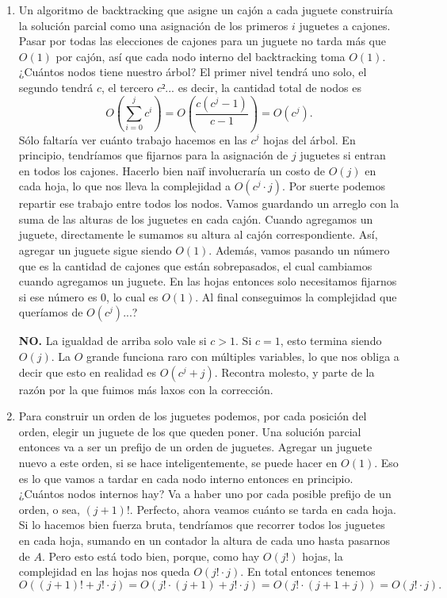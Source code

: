 \documentclass{article}
\begin{document}
\begin{enumerate}
    \item Un algoritmo de backtracking que asigne un cajón a cada juguete construiría la solución parcial como una asignación de los primeros $i$ juguetes a cajones. Pasar por todas las elecciones de cajones para un juguete no tarda más que $O(1)$ por cajón, así que cada nodo interno del backtracking toma $O(1)$. ¿Cuántos nodos tiene nuestro árbol? El primer nivel tendrá uno solo, el segundo tendrá $c$, el tercero $c²$... es decir, la cantidad total de nodos es 
    \[
    O\left(\sum_{i=0}^j c^i\right) = O\left(\frac{c(c^j - 1)}{c-1}\right) = O(c^j).
    \]
    Sólo faltaría ver cuánto trabajo hacemos en las $c^j$ hojas del árbol. En principio, tendríamos que fijarnos para la asignación de $j$ juguetes si entran en todos los cajones. Hacerlo bien naïf involucraría un costo de $O(j)$ en cada hoja, lo que nos lleva la complejidad a $O(c^j\cdot j)$. Por suerte podemos repartir ese trabajo entre todos los nodos. Vamos guardando un arreglo con la suma de las alturas de los juguetes en cada cajón. Cuando agregamos un juguete, directamente le sumamos su altura al cajón correspondiente. Así, agregar un juguete sigue siendo $O(1)$. Además, vamos pasando un número que es la cantidad de cajones que están sobrepasados, el cual cambiamos cuando agregamos un juguete. En las hojas entonces solo necesitamos fijarnos si ese número es 0, lo cual es $O(1)$. Al final conseguimos la complejidad que queríamos de $O(c^j)$...?
    
    \textbf{NO.} La igualdad de arriba solo vale si $c>1$. Si $c = 1$, esto termina siendo $O(j)$. La $O$ grande funciona raro con múltiples variables, lo que nos obliga a decir que esto en realidad es $O(c^j + j)$. Recontra molesto, y parte de la razón por la que fuimos más laxos con la corrección.
    
    \item Para construir un orden de los juguetes podemos, por cada posición del orden, elegir un juguete de los que queden poner. Una solución parcial entonces va a ser un prefijo de un orden de juguetes. Agregar un juguete nuevo a este orden, si se hace inteligentemente, se puede hacer en $O(1)$. Eso es lo que vamos a tardar en cada nodo interno entonces en principio. ¿Cuántos nodos internos hay? Va a haber uno por cada posible prefijo de un orden, o sea, $(j+1)!$. Perfecto, ahora veamos cuánto se tarda en cada hoja. Si lo hacemos bien fuerza bruta, tendríamos que recorrer todos los juguetes en cada hoja, sumando en un contador la altura de cada uno hasta pasarnos de $A$. Pero esto está todo bien, porque, como hay $O(j!)$ hojas, la complejidad en las hojas nos queda $O(j! \cdot j)$. En total entonces tenemos 
    \[
    O((j+1)! + j! \cdot j) = O(j! \cdot (j+1) + j! \cdot j) = O(j! \cdot (j+1 + j))= O(j! \cdot j).
    \]
\end{enumerate}
\end{document}
